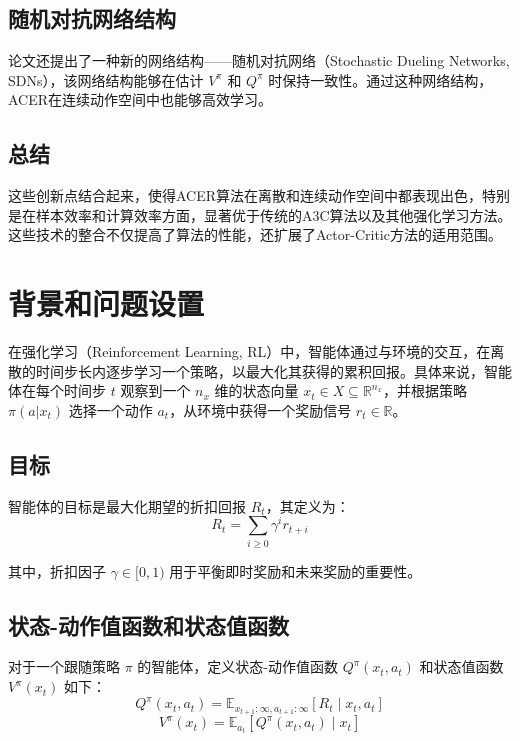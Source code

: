 \documentclass[twocolumn, 10pt]{article} %
\theoremstyle{remark}
\begin{document}
\subsection{随机对抗网络结构}

论文还提出了一种新的网络结构——随机对抗网络（Stochastic Dueling Networks, SDNs），该网络结构能够在估计 \(V^\pi\) 和 \(Q^\pi\) 时保持一致性。通过这种网络结构，ACER在连续动作空间中也能够高效学习。

\subsection{总结}

这些创新点结合起来，使得ACER算法在离散和连续动作空间中都表现出色，特别是在样本效率和计算效率方面，显著优于传统的A3C算法以及其他强化学习方法。这些技术的整合不仅提高了算法的性能，还扩展了Actor-Critic方法的适用范围。


\section{背景和问题设置}

在强化学习（Reinforcement Learning, RL）中，智能体通过与环境的交互，在离散的时间步长内逐步学习一个策略，以最大化其获得的累积回报。具体来说，智能体在每个时间步 \( t \) 观察到一个 \( n_x \) 维的状态向量 \( x_t \in X \subseteq \mathbb{R}^{n_x} \)，并根据策略 \( \pi(a | x_t) \) 选择一个动作 \( a_t \)，从环境中获得一个奖励信号 \( r_t \in \mathbb{R} \)。

\subsection{目标}

智能体的目标是最大化期望的折扣回报 \( R_t \)，其定义为：
\[
R_t = \sum_{i \geq 0} \gamma^i r_{t+i}
\]

其中，折扣因子 \( \gamma \in [0, 1) \) 用于平衡即时奖励和未来奖励的重要性。

\subsection{状态-动作值函数和状态值函数}

对于一个跟随策略 \( \pi \) 的智能体，定义状态-动作值函数 \( Q^\pi(x_t, a_t) \) 和状态值函数 \( V^\pi(x_t) \) 如下：
\[
Q^\pi(x_t, a_t) = \mathbb{E}_{x_{t+1}:\infty, a_{t+1}:\infty} \left[R_t \mid x_t, a_t\right]
\]
\[
V^\pi(x_t) = \mathbb{E}_{a_t} \left[Q^\pi(x_t, a_t) \mid x_t\right]
\]
\end{document}
